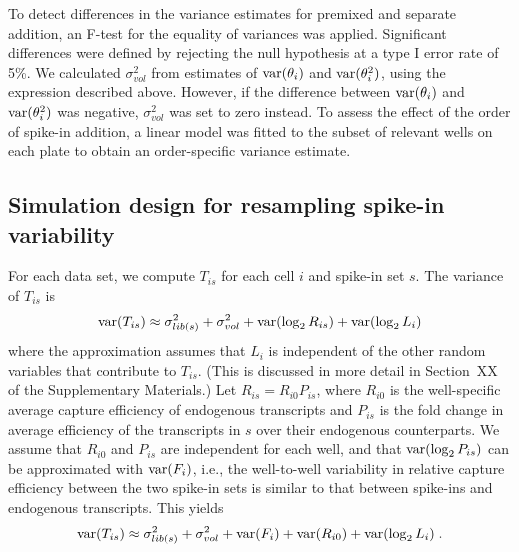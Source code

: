 \documentclass{article}
\begin{document}
To detect differences in the variance estimates for premixed and separate addition, an F-test for the equality of variances was applied.
Significant differences were defined by rejecting the null hypothesis at a type I error rate of 5\%.
We calculated $\sigma^2_{vol}$ from estimates of $\mbox{var}(\theta_i)$ and $\mbox{var}(\theta^2_i)$, using the expression described above.
However, if the difference between $\mbox{var}(\theta_i)$ and $\mbox{var}(\theta^2_i)$ was negative, $\sigma^2_{vol}$ was set to zero instead.
To assess the effect of the order of spike-in addition, a linear model was fitted to the subset of relevant wells on each plate to obtain an order-specific variance estimate.

\subsection{Simulation design for resampling spike-in variability}
For each data set, we compute $T_{is}$ for each cell $i$ and spike-in set $s$.
The variance of $T_{is}$ is
\[
    \mbox{var}(T_{is}) \approx \sigma^2_{lib(s)} + \sigma^2_{vol} + \mbox{var}(\log_2 R_{is}) + \mbox{var}(\log_2 L_i)
\]
where the approximation assumes that $L_i$ is independent of the other random variables that contribute to $T_{is}$.
(This is discussed in more detail in Section~XX of the Supplementary Materials.)
Let $R_{is} = R_{i0}P_{is}$, where $R_{i0}$ is the well-specific average capture efficiency of endogenous transcripts and $P_{is}$ is the fold change in average efficiency of the transcripts in $s$ over their endogenous counterparts.
We assume that $R_{i0}$ and $P_{is}$ are independent for each well, and that $\mbox{var}(\log_2 P_{is})$ can be approximated with $\mbox{var}(F_i)$,
i.e., the well-to-well variability in relative capture efficiency between the two spike-in sets is similar to that between spike-ins and endogenous transcripts.
This yields
\[
    \mbox{var}(T_{is}) \approx \sigma^2_{lib(s)} + \sigma^2_{vol} + \mbox{var}(F_i) + \mbox{var}(R_{i0}) + \mbox{var}(\log_2 L_i) \;.
\]

\end{document}
